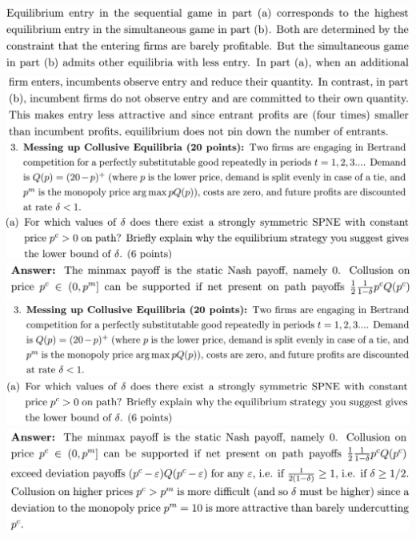 \documentclass[8pt,landscape]{extarticle}
\begin{document}
\begin{multicols*}{3}
    \includegraphics[width=0.7\linewidth,keepaspectratio]{Screenshots/Screenshot 2024-03-11 171847.png}
    \includegraphics[width=0.7\linewidth,keepaspectratio]{Screenshots/Screenshot 2024-03-11 171853.png}
    \includegraphics[width=0.78\linewidth,keepaspectratio]{Screenshots/Screenshot 2024-03-11 171900.png}
    \includegraphics[width=0.73\linewidth,keepaspectratio]{Screenshots/Screenshot 2024-03-11 171905.png}
    \includegraphics[width=0.7\linewidth,keepaspectratio]{Screenshots/Screenshot 2024-03-11 171908.png}
    \includegraphics[width=0.78\linewidth,keepaspectratio]{Screenshots/Screenshot 2024-03-11 171935.png}
    \includegraphics[width=0.73\linewidth,keepaspectratio]{Screenshots/Screenshot 2024-03-11 171940.png}
    \includegraphics[width=0.71\linewidth,keepaspectratio]{Screenshots/Screenshot 2024-03-11 171943.png}
    \includegraphics[width=0.71\linewidth,keepaspectratio]{Screenshots/Screenshot 2024-03-11 171953.png}

\end{multicols*}
\end{document}
